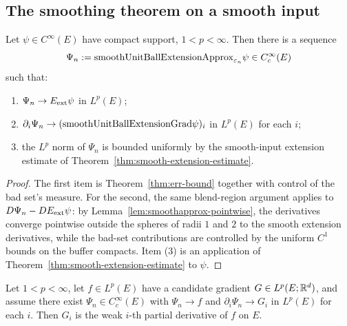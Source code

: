 \subsection*{The smoothing theorem on a smooth input}

\begin{theorem}
\label{thm:smooth-input-smoothing}
\leanok
{}
Let $\psi \in C^\infty(E)$ have compact support, $1 < p < \infty$. Then there
is a sequence
\begin{equation*}
  \Psi_n := \mathrm{smoothUnitBallExtensionApprox}_{\varepsilon_n}\psi \in C^\infty_c(E)
\end{equation*}
such that:
\begin{enumerate}
\item $\Psi_n \to E_{\mathrm{ext}} \psi$ in $L^p(E)$;
\item $\partial_i \Psi_n \to (\mathrm{smoothUnitBallExtensionGrad}\psi)_i$ in $L^p(E)$
for each $i$;
\item the $L^p$ norm of $\Psi_n$ is bounded uniformly by the smooth-input
extension estimate of Theorem~\ref{thm:smooth-extension-estimate}.
\end{enumerate}
\end{theorem}

\begin{proof}
\leanok
{}

The first item is Theorem~\ref{thm:err-bound} together with control of the
bad set's measure. For the second, the same blend-region argument applies to
$D\Psi_n - DE_{\mathrm{ext}}\psi$: by Lemma~\ref{lem:smoothapprox-pointwise}, the
derivatives converge pointwise outside the spheres of radii $1$ and $2$ to
the smooth extension derivatives, while the bad-set contributions are
controlled by the uniform $C^1$ bounds on the buffer compacts. Item (3) is
an application of Theorem~\ref{thm:smooth-extension-estimate} to $\psi$.
\end{proof}

\begin{theorem}
\label{thm:hasWeakPartials_of_global_smoothApprox}
\leanok
{}
Let $1 < p < \infty$, let $f \in L^p(E)$ have a candidate gradient $G \in
L^p(E; \mathbb{R}^d)$, and assume there exist $\Psi_n \in C^\infty_c(E)$ with
$\Psi_n \to f$ and $\partial_i \Psi_n \to G_i$ in $L^p(E)$ for each $i$. Then
$G_i$ is the weak $i$-th partial derivative of $f$ on $E$.
\end{theorem}

